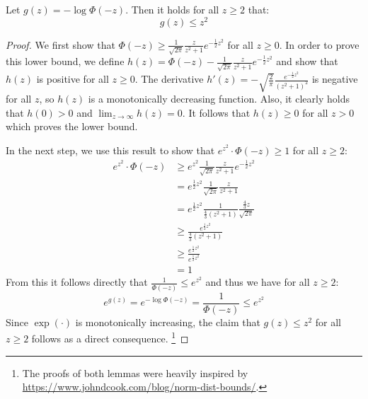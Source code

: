 \begin{lemma}
    Let $g(z) = -\log \Phi(-z)$. Then it holds for all $z \geq 2$ that:
    $$
        g(z) \leq z^2
    $$
\end{lemma}
\begin{proof}
    We first show that $\Phi(-z) \geq \frac{1}{\sqrt{2 \pi}} \frac{z}{z^2 + 1} e^{-\frac{1}{2} z^2}$
    for all $z \geq 0$.
    In order to prove this lower bound, we define 
    $h(z) = \Phi(-z) - \frac{1}{\sqrt{2 \pi}} \frac{z}{z^2 + 1} e^{-\frac{1}{2} z^2}$
    and show that $h(z)$ is positive for all $z \geq 0$.
    The derivative $h'(z) = -\sqrt{\frac{2}{\pi}} \frac{e^{-\frac{1}{2} z^2}}{(z^2 + 1)^2}$ is 
    negative for all $z$, so $h(z)$ is a monotonically decreasing function.
    Also, it clearly holds that $h(0) > 0$ and 
    $\lim_{z \rightarrow \infty} h(z) = 0$. It follows that $h(z) \geq 0$
    for all $z > 0$ which proves the lower bound.
    
    In the next step, we use this result to show that $e^{z^2} \cdot \Phi(-z) \geq 1$
    for all $z \geq 2$:
    \begin{align*} 
        e^{z^2} \cdot \Phi(-z) & \geq e^{z^2} \frac{1}{\sqrt{2 \pi}} \frac{z}{z^2 + 1} e^{-\frac{1}{2} z^2}                           \\
                               & = e^{\frac{1}{2} z^2} \frac{1}{\sqrt{2 \pi}} \frac{z}{z^2 + 1}                                       \\ 
                               & = e^{\frac{1}{2} z^2} \frac{1}{\frac{4}{3}\left( z^2 + 1 \right)} \frac{\frac{4}{3} z}{\sqrt{2 \pi}} \\
                               & \geq \frac{e^{\frac{1}{2} z^2}}{\frac{4}{3}\left( z^2 + 1 \right)}                                   \\
                               & \geq \frac{e^{\frac{1}{2} z^2}}{e^{\frac{1}{2} z^2}}                                                 \\
                               & = 1
    \end{align*}
    From this it follows directly that $\frac{1}{\Phi(-z)} \leq e^{z^2}$
    and thus we have for all $z \geq 2$:
    $$
        e^{g(z)} = e^{-\log \Phi(-z)} = \frac{1}{\Phi(-z)} \leq e^{z^2}
    $$
    Since $\exp{\left( \cdot \right)}$ is monotonically increasing, the claim 
    that $g(z) \leq z^2$ for all $z \geq 2$ follows as a direct consequence.
    \footnote{The proofs of both lemmas were heavily inspired by
        \url{https://www.johndcook.com/blog/norm-dist-bounds/}.}
\end{proof}

